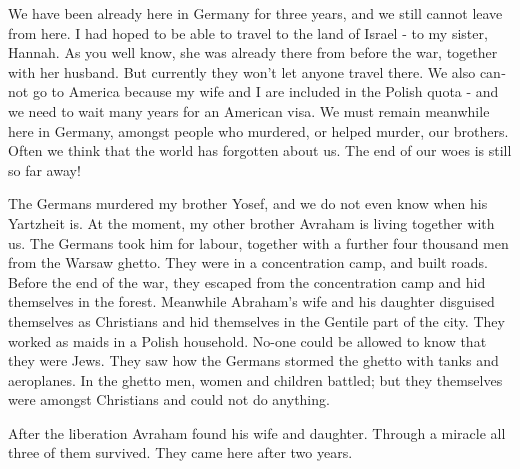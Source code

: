 \documentclass{article}
\begin{document}
\begin{pairs}
\begin{Leftside}
\begin{english}
\beginnumbering

\autopar
We have been already here in Germany for three years, and we still cannot leave from here.
I had hoped to be able to travel to the land of Israel - to my sister, Hannah.
As you well know, she was already there from before the war, together with her husband.
But currently they won't let anyone travel there.
We also cannot go to America because my wife and I are included in the Polish quota - and we need to wait many years for an American visa.
We must remain meanwhile here in Germany, amongst people who murdered, or helped murder, our brothers.
Often we think that the world has forgotten about us. The end of our woes is still so far away!


The Germans murdered my brother Yosef, and we do not even know when his Yartzheit is.
 At the moment, my other brother Avraham is living together with us.
 The Germans took him for labour, together with a further four thousand men from the Warsaw ghetto.
 They were in a concentration camp, and built roads.
 Before the end of the war, they escaped from the concentration camp and hid themselves in the forest.
 Meanwhile Abraham's wife and his daughter disguised themselves as Christians and hid themselves in the Gentile part of the city.
 They worked as maids in a Polish household.
 No-one could be allowed to know that they were Jews.
 They saw how the Germans stormed the ghetto with tanks and aeroplanes.
 In the ghetto men, women and children battled; but they themselves were amongst Christians and could not do anything.
 
 
 After the liberation Avraham found his wife and daughter.
 Through a miracle all three of them survived.
 They came here after two years.
 
\endnumbering
\end{english}
\end{Leftside}

\end{pairs}
\Columns
\end{document}
